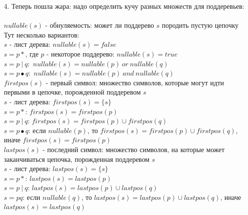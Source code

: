 \documentclass[14pt]{extreport}
\begin{document}
	4. Теперь пошла жара: надо определить кучу разных множеств для поддеревьев:\\\\
	$nullable(s)$ - обнуляемость: может ли поддерево $s$ породить пустую цепочку\\
	Тут несколько вариантов:\\
	\hspace*{30pt}$s$ - лист дерева: $nullable(s)=false$\\
	\hspace*{30pt}$s=p*$, где $p$ - некоторое поддерево: $nullable(s)=true$\\
	\hspace*{30pt}$s=p\ |\ q$:\ $nullable(s)=nullable(p)\ or\ nullable(q)$\\
	\hspace*{30pt}$s=p \bullet q$:\ $nullable(s)=nullable(p)\ and\ nullable(q)$\\
	$firstpos(s)$ - первый символ: множество символов, которые могут идти первыми
	в цепочке, порожденной поддеревом $s$\\
	\hspace*{30pt}$s$ - лист дерева: $firstpos(s)=\{s\}$\\
	\hspace*{30pt}$s=p*$: $firstpos(s)=firstpos(p)$\\
	\hspace*{30pt}$s=p\ |\ q$: $firstpos(s)=firstpos(p) \cup firstpos(q)$\\
	\hspace*{30pt}$s=p \bullet q$: если $nullable(p)$, то $firstpos(s)=firstpos(p) \cup firstpos(q)$,
	\hspace*{30pt}иначе $firstpos(s)=firstpos(p)$ \\
	$lastpos(s)$ - последний символ: множество символов, на которые может заканчиваться
	цепочка, порожденная поддеревом $s$\\
	\hspace*{30pt}$s$ - лист дерева: $lastpos(s)=\{s\}$\\
	\hspace*{30pt}$s=p*$: $lastpos(s)=lastpos(p)$\\
	\hspace*{30pt}$s=p\ |\ q$: $lastpos(s)=lastpos(p) \cup lastpos(q)$\\
	\hspace*{30pt}$s=pq$: если $nullable(q)$, то $lastpos(s)=lastpos(p) \cup lastpos(q)$,
	\hspace*{30pt}иначе $lastpos(s)=lastpos(q)$ \\\\
\end{document}

